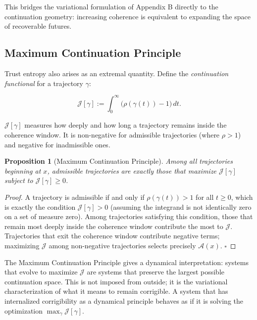 \documentclass[11pt,a4paper]{article}
\theoremstyle{definition}
\theoremstyle{plain}
\newtheorem{proposition}[theorem]{Proposition}
\begin{document}
\begin{mdframed}[style=appendixbox]
This bridges the variational formulation of Appendix B directly to the continuation geometry: increasing coherence is equivalent to expanding the space of recoverable futures.

\subsection{Maximum Continuation Principle}

Trust entropy also arises as an extremal quantity. Define the \emph{continuation functional} for a trajectory $\gamma$:

\begin{equation}
\mathcal{J}[\gamma] := \int_0^\infty \bigl(\rho(\gamma(t)) - 1\bigr)\,dt.
\end{equation}

$\mathcal{J}[\gamma]$ measures how deeply and how long a trajectory remains inside the coherence window. It is non-negative for admissible trajectories (where $\rho > 1$) and negative for inadmissible ones.

\begin{proposition}[Maximum Continuation Principle]
Among all trajectories beginning at $x$, admissible trajectories are exactly those that maximize $\mathcal{J}[\gamma]$ subject to $\mathcal{J}[\gamma] \geq 0$.
\end{proposition}

\begin{proof}
A trajectory is admissible if and only if $\rho(\gamma(t)) > 1$ for all $t \geq 0$, which is exactly the condition $\mathcal{J}[\gamma] > 0$ (assuming the integrand is not identically zero on a set of measure zero). Among trajectories satisfying this condition, those that remain most deeply inside the coherence window contribute the most to $\mathcal{J}$. Trajectories that exit the coherence window contribute negative terms; maximizing $\mathcal{J}$ among non-negative trajectories selects precisely $\mathcal{A}(x)$. $\square$
\end{proof}

The Maximum Continuation Principle gives a dynamical interpretation: systems that evolve to maximize $\mathcal{J}$ are systems that preserve the largest possible continuation space. This is not imposed from outside; it is the variational characterization of what it means to remain corrigible. A system that has internalized corrigibility as a dynamical principle behaves as if it is solving the optimization $\max_\gamma \mathcal{J}[\gamma]$.


\end{mdframed}
\end{document}
